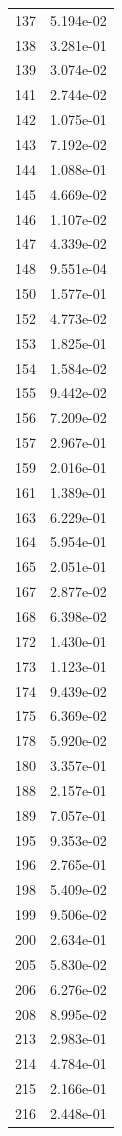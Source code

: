 \documentclass[12pt]{article}
\begin{document}
\begin{longtable}{@{}cc@{}}
137 & 5.194e-02 \\
138 & 3.281e-01 \\
139 & 3.074e-02 \\
141 & 2.744e-02 \\
142 & 1.075e-01 \\
143 & 7.192e-02 \\
144 & 1.088e-01 \\
145 & 4.669e-02 \\
146 & 1.107e-02 \\
147 & 4.339e-02 \\
148 & 9.551e-04 \\
150 & 1.577e-01 \\
152 & 4.773e-02 \\
153 & 1.825e-01 \\
154 & 1.584e-02 \\
155 & 9.442e-02 \\
156 & 7.209e-02 \\
157 & 2.967e-01 \\
159 & 2.016e-01 \\
161 & 1.389e-01 \\
163 & 6.229e-01 \\
164 & 5.954e-01 \\
165 & 2.051e-01 \\
167 & 2.877e-02 \\
168 & 6.398e-02 \\
172 & 1.430e-01 \\
173 & 1.123e-01 \\
174 & 9.439e-02 \\
175 & 6.369e-02 \\
178 & 5.920e-02 \\
180 & 3.357e-01 \\
188 & 2.157e-01 \\
189 & 7.057e-01 \\
195 & 9.353e-02 \\
196 & 2.765e-01 \\
198 & 5.409e-02 \\
199 & 9.506e-02 \\
200 & 2.634e-01 \\
205 & 5.830e-02 \\
206 & 6.276e-02 \\
208 & 8.995e-02 \\
213 & 2.983e-01 \\
214 & 4.784e-01 \\
215 & 2.166e-01 \\
216 & 2.448e-01 \\

\end{longtable}
\end{document}
